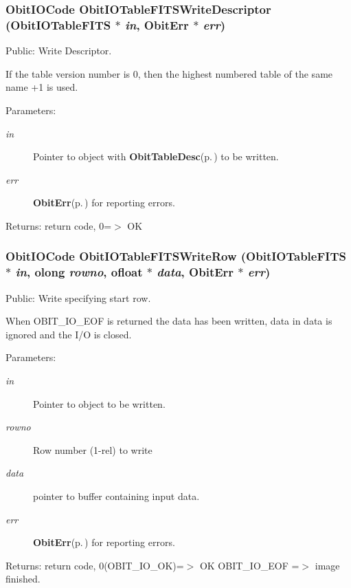 \subsubsection{\setlength{\rightskip}{0pt plus 5cm}Obit\-IOCode Obit\-IOTable\-FITSWrite\-Descriptor ({\bf Obit\-IOTable\-FITS} $\ast$ {\em in}, {\bf Obit\-Err} $\ast$ {\em err})}\label{ObitIOTableFITS_8c_a28}


Public: Write Descriptor. 

If the table version number is 0, then the highest numbered table of the same name +1 is used. \begin{Desc}
\item[Parameters:]
\begin{description}
\item[{\em in}]Pointer to object with {\bf Obit\-Table\-Desc}{\rm (p.\,\pageref{structObitTableDesc})} to be written. \item[{\em err}]{\bf Obit\-Err}{\rm (p.\,\pageref{structObitErr})} for reporting errors. \end{description}
\end{Desc}
\begin{Desc}
\item[Returns:]return code, 0=$>$ OK \end{Desc}
\subsubsection{\setlength{\rightskip}{0pt plus 5cm}Obit\-IOCode Obit\-IOTable\-FITSWrite\-Row ({\bf Obit\-IOTable\-FITS} $\ast$ {\em in}, {\bf olong} {\em rowno}, {\bf ofloat} $\ast$ {\em data}, {\bf Obit\-Err} $\ast$ {\em err})}\label{ObitIOTableFITS_8c_a25}


Public: Write specifying start row. 

When OBIT\_\-IO\_\-EOF is returned the data has been written, data in data is ignored and the I/O is closed. \begin{Desc}
\item[Parameters:]
\begin{description}
\item[{\em in}]Pointer to object to be written. \item[{\em rowno}]Row number (1-rel) to write \item[{\em data}]pointer to buffer containing input data. \item[{\em err}]{\bf Obit\-Err}{\rm (p.\,\pageref{structObitErr})} for reporting errors. \end{description}
\end{Desc}
\begin{Desc}
\item[Returns:]return code, 0(OBIT\_\-IO\_\-OK)=$>$ OK OBIT\_\-IO\_\-EOF =$>$ image finished. \end{Desc}
